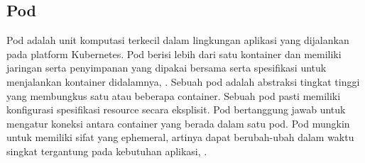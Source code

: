 \subsection{Pod}
Pod adalah unit komputasi terkecil dalam lingkungan aplikasi yang dijalankan pada platform Kubernetes. Pod berisi lebih dari satu kontainer dan memiliki jaringan serta penyimpanan yang dipakai bersama serta spesifikasi untuk menjalankan kontainer didalamnya, \parencite{pod}.
Sebuah pod adalah abstraksi tingkat tinggi yang membungkus satu atau beberapa container. Sebuah pod pasti memiliki konfigurasi spesifikasi resource secara eksplisit. Pod bertanggung jawab untuk mengatur koneksi antara container yang berada dalam satu pod. Pod mungkin untuk memiliki sifat yang ephemeral, artinya dapat berubah-ubah dalam waktu singkat tergantung pada kebutuhan aplikasi, \parencite{ephemeral}.